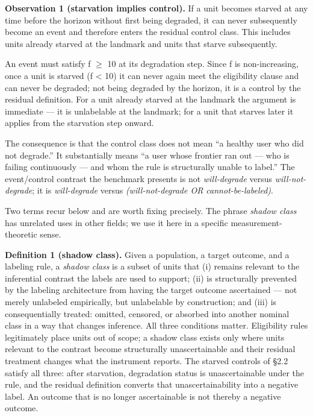 \documentclass[
  11pt,
]{article}
\begin{document}
\textbf{Observation 1 (starvation implies control).} If a unit becomes
starved at any time before the horizon without first being degraded, it
can never subsequently become an event and therefore enters the residual
control class. This includes units already starved at the landmark and
units that starve subsequently.

An event must satisfy f \(\geq\) 10 at its degradation step. Since f is
non-increasing, once a unit is starved (f \textless{} 10) it can never
again meet the eligibility clause and can never be degraded; not being
degraded by the horizon, it is a control by the residual definition. For
a unit already starved at the landmark the argument is immediate --- it
is unlabelable at the landmark; for a unit that starves later it applies
from the starvation step onward.

The consequence is that the control class does not mean ``a healthy user
who did not degrade.'' It substantially means ``a user whose frontier
ran out --- who is failing continuously --- and whom the rule is
structurally unable to label.'' The event/control contrast the benchmark
presents is not \emph{will-degrade} versus \emph{will-not-degrade}; it
is \emph{will-degrade} versus \emph{(will-not-degrade OR
cannot-be-labeled)}.

Two terms recur below and are worth fixing precisely. The phrase
\emph{shadow class} has unrelated uses in other fields; we use it here
in a specific measurement-theoretic sense.

\textbf{Definition 1 (shadow class).} Given a population, a target
outcome, and a labeling rule, a \emph{shadow class} is a subset of units
that (i) remains relevant to the inferential contrast the labels are
used to support; (ii) is structurally prevented by the labeling
architecture from having the target outcome ascertained --- not merely
unlabeled empirically, but unlabelable by construction; and (iii) is
consequentially treated: omitted, censored, or absorbed into another
nominal class in a way that changes inference. All three conditions
matter. Eligibility rules legitimately place units out of scope; a
shadow class exists only where units relevant to the contrast become
structurally unascertainable and their residual treatment changes what
the instrument reports. The starved controls of §2.2 satisfy all three:
after starvation, degradation status is unascertainable under the rule,
and the residual definition converts that unascertainability into a
negative label. An outcome that is no longer ascertainable is not
thereby a negative outcome.
\end{document}

